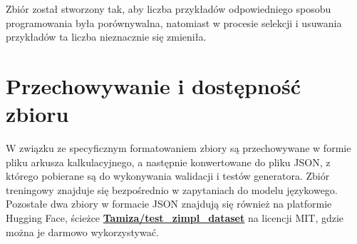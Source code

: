 Zbiór został stworzony tak, aby liczba przykładów odpowiedniego sposobu programowania była porównywalna, natomiast w procesie selekcji i usuwania przykładów ta liczba nieznacznie się zmieniła.

\section{Przechowywanie i dostępność zbioru}

W związku ze specyficznym formatowaniem zbiory są przechowywane w formie pliku arkusza kalkulacyjnego, a następnie konwertowane do pliku JSON, z którego pobierane są do wykonywania walidacji i testów generatora. Zbiór treningowy znajduje się bezpośrednio w zapytaniach do modelu językowego. Pozostałe dwa zbiory w formacie JSON znajdują się również na platformie Hugging Face, ścieżce \href{https://huggingface.co/datasets/Tamiza/test_zimpl_dataset}{\textbf{Tamiza/test\_zimpl\_dataset}} na licencji MIT, gdzie można je darmowo wykorzystywać.